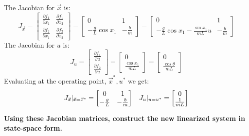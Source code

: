 \begin{enumerate}
{    The Jacobian for $\vec{x}$ is:
    $$J_{\vec{x}} =
    \begin{bmatrix} \frac{\partial f_{1}}{\partial x_{1}} & \frac{\partial f_{1}}{\partial x_{2}} \\
    \frac{\partial f_{2}}{\partial x_{1}} & \frac{\partial f_{2}}{\partial x_{2}}
    \end{bmatrix} =
    \begin{bmatrix} 0 & 1 \\
    -\frac{g}{L} \cos x_{1} & -\frac{b}{m}
    \end{bmatrix} =
    \begin{bmatrix} 0 & 1 \\
    -\frac{g}{L} \cos x_1 - \frac{\sin{x_1}}{mL} u & -\frac{b}{m}
    \end{bmatrix}
    $$
    The Jacobian for $u$ is:
    $$J_{u} =
    \begin{bmatrix} \frac{\partial f_{1}}{\partial u} \\ \frac{\partial f_{2}}{\partial u} \end{bmatrix} =
    \begin{bmatrix} 0 \\ \frac{\cos x_{1}}{mL} \end{bmatrix} =
    \begin{bmatrix} 0 \\ \frac{\cos \theta}{mL} \end{bmatrix}
    $$
    Evaluating at the operating point, $\vec{x}^{*}, u^{*}$ we get:
    $$J_{\vec{x}} |_{\vec{x} = \vec{x}^{*}} =
    \begin{bmatrix} 0 & 1 \\
    -\frac{g}{L} & -\frac{b}{m}
    \end{bmatrix} \hspace{0.3 cm}
    J_{u} |_{u = u^{*}} =
    \begin{bmatrix} 0 \\ \frac{1}{mL} \end{bmatrix}
    $$
  }

  \qitem \textbf{Using these Jacobian matrices, construct the new linearized system in state-space form.}
  \ws {
    \vspace{125px}
  }


\end{enumerate}

